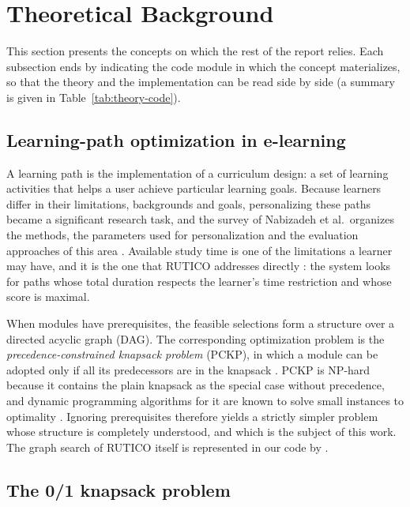 \section{Theoretical Background}\label{sec:background}

This section presents the concepts on which the rest of the report relies. Each subsection ends by indicating the code module in which the concept materializes, so that the theory and the implementation can be read side by side (a summary is given in Table~\ref{tab:theory-code}).

\subsection{Learning-path optimization in e-learning}

A learning path is the implementation of a curriculum design: a set of learning activities that helps a user achieve particular learning goals. Because learners differ in their limitations, backgrounds and goals, personalizing these paths became a significant research task, and the survey of Nabizadeh et al.\ organizes the methods, the parameters used for personalization and the evaluation approaches of this area \cite{nabizadeh2020survey}. Available study time is one of the limitations a learner may have, and it is the one that RUTICO addresses directly \cite{nabizadeh2017rutico}: the system looks for paths whose total duration respects the learner's time restriction and whose score is maximal.

When modules have prerequisites, the feasible selections form a structure over a directed acyclic graph (DAG). The corresponding optimization problem is the \emph{precedence-constrained knapsack problem} (PCKP), in which a module can be adopted only if all its predecessors are in the knapsack \cite{samphaiboon2000}. PCKP is NP-hard because it contains the plain knapsack as the special case without precedence, and dynamic programming algorithms for it are known to solve small instances to optimality \cite{samphaiboon2000}. Ignoring prerequisites therefore yields a strictly simpler problem whose structure is completely understood, and which is the subject of this work. The graph search of RUTICO itself is represented in our code by .

\subsection{The 0/1 knapsack problem}\label{sec:knapsack}

